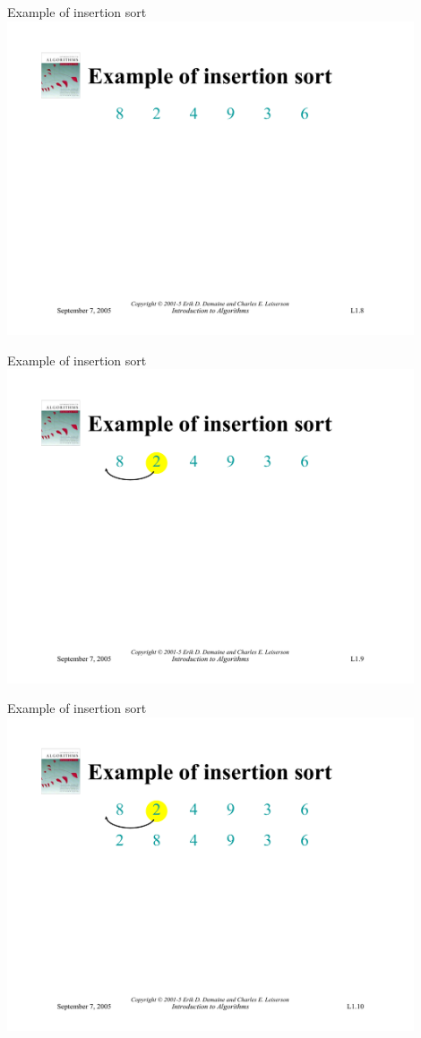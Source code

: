 \documentclass{beamer}
\begin{document}
\begin{frame}{Example of insertion sort}
    \centering
    \includegraphics[width=0.9\textwidth, trim={5cm 2.95cm 5cm 4.25cm}, clip]{pages/lec1_8}
\end{frame}
\begin{frame}{Example of insertion sort}
    \centering
    \includegraphics[width=0.9\textwidth, trim={5cm 2.95cm 5cm 4.25cm}, clip]{pages/lec1_9}
\end{frame}
\begin{frame}{Example of insertion sort}
    \centering
    \includegraphics[width=0.9\textwidth, trim={5cm 2.95cm 5cm 4.25cm}, clip]{pages/lec1_10}
\end{frame}
\end{document}
